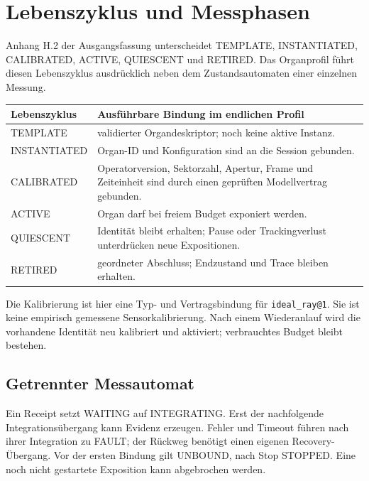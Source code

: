 \documentclass[11pt,a4paper]{article}
\newcommand{\nextsection}[2]{\clearpage{\color{accent}\small\textsf{#1}}\section{#2}}
\begin{document}
\nextsection{22 / ORGANIDENTITÄT}{Lebenszyklus und Messphasen}
Anhang H.2 der Ausgangsfassung unterscheidet TEMPLATE,
INSTANTIATED, CALIBRATED, ACTIVE, QUIESCENT und RETIRED.
Das Organprofil führt diesen Lebenszyklus ausdrücklich neben
dem Zustandsautomaten einer einzelnen Messung.

\begin{tabularx}{\linewidth}{@{}lY@{}}
\toprule
Lebenszyklus & Ausführbare Bindung im endlichen Profil\\\midrule
TEMPLATE & validierter Organdeskriptor; noch keine aktive Instanz.\\
INSTANTIATED & Organ-ID und Konfiguration sind an die Session gebunden.\\
CALIBRATED & Operatorversion, Sektorzahl, Apertur, Frame und Zeiteinheit
sind durch einen geprüften Modellvertrag gebunden.\\
ACTIVE & Organ darf bei freiem Budget exponiert werden.\\
QUIESCENT & Identität bleibt erhalten; Pause oder Trackingverlust
unterdrücken neue Expositionen.\\
RETIRED & geordneter Abschluss; Endzustand und Trace bleiben erhalten.\\
\bottomrule
\end{tabularx}

Die Kalibrierung ist hier eine Typ- und Vertragsbindung für
\texttt{ideal\_ray@1}. Sie ist keine empirisch gemessene
Sensorkalibrierung. Nach einem Wiederanlauf wird die vorhandene
Identität neu kalibriert und aktiviert; verbrauchtes Budget bleibt bestehen.

\subsection{Getrennter Messautomat}
\begin{center}
\end{center}
Ein Receipt setzt WAITING auf INTEGRATING. Erst der
nachfolgende Integrationsübergang kann Evidenz erzeugen.
Fehler und Timeout führen nach ihrer Integration zu FAULT;
der Rückweg benötigt einen eigenen Recovery-Übergang.
Vor der ersten Bindung gilt UNBOUND, nach Stop STOPPED.
Eine noch nicht gestartete Exposition kann abgebrochen werden.
\end{document}
